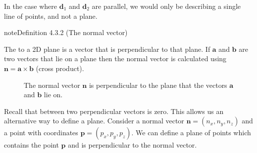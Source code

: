 \documentclass[letterpaper,10pt,english]{jupyterBook}
\let\sphinxpxdimen\pdfpxdimen\else\newdimen\sphinxpxdimen
\begin{document}
\sphinxAtStartPar
In the case where \(\mathbf{d}_1\) and \(\mathbf{d}_2\) are parallel, we would  only be describing a single line of points, and not a plane.

\ignorespaces \label{_pages/4.2_Planes:normal-vector-definition}
\begin{sphinxadmonition}{note}{Definition 4.3.2 (The normal vector)}



\sphinxAtStartPar
The  to a 2D plane is a vector that is perpendicular to that plane. If \(\mathbf{a}\) and \(\mathbf{b}\) are two vectors that lie on a plane then the normal vector is calculated using \(\mathbf{n} = \mathbf{a} \times \mathbf{b}\) (cross product).

\begin{figure}[htbp]
\centering
\capstart

\noindent\sphinxincludegraphics[width=450\sphinxpxdimen]{{4_normal_vector}.svg}
\caption{The normal vector \(\mathbf{n}\) is perpendicular to the plane that the vectors \(\mathbf{a}\) and \(\mathbf{b}\) lie on.}\label{\detokenize{_pages/4.2_Planes:plane-2-figure}}\end{figure}
\end{sphinxadmonition}

\sphinxAtStartPar
Recall that {\hyperref[\detokenize{_pages/3.3_Dot_and_cross_products:dot-product-definition}]{}} between two perpendicular vectors is zero. This allows us an alternative way to define a plane. Consider a normal vector \(\mathbf{n} = (n_x, n_y, n_z)\) and a point with coordinates \(\mathbf{p}=(p_x, p_y, p_z)\). We can define a plane of points which contains the point \(\mathbf{p}\) and is perpendicular to the normal vector.
\end{document}
